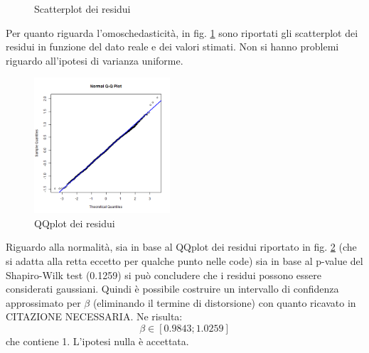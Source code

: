 \documentclass[a4paper,11pt,twoside,openright]{book}							%
\begin{document}
\begin{figure}[t]
	\centering
	\caption{Scatterplot dei residui}
	\label{fig:DomCcovar_residui}
\end{figure}

Per quanto riguarda l'omoschedasticità, in fig. \ref{fig:DomCcovar_residui} sono riportati gli scatterplot dei residui in funzione del dato reale e dei valori stimati. Non si hanno problemi riguardo all'ipotesi di varianza uniforme.

\begin{figure}[h]
	\centering
	\includegraphics[width=0.45\textwidth]{Immagini/DomCCovar/QQplot.png}   
   \caption{QQplot dei residui}
	\label{fig:DomCcovar_qqplot}
\end{figure}
\newpage
Riguardo alla normalità, sia in base al QQplot dei residui riportato in fig. \ref{fig:DomCcovar_qqplot} (che si adatta alla retta eccetto per qualche punto nelle code) sia in base al p-value del Shapiro-Wilk test (0.1259) si può concludere che i residui possono essere considerati gaussiani. Quindi è possibile costruire un intervallo di confidenza approssimato per $\beta$ (eliminando il termine di distorsione) con quanto ricavato in CITAZIONE NECESSARIA. Ne risulta:
$$
\beta \in [0.9843;1.0259]
$$
che contiene 1. L'ipotesi nulla è accettata.
\end{document}
